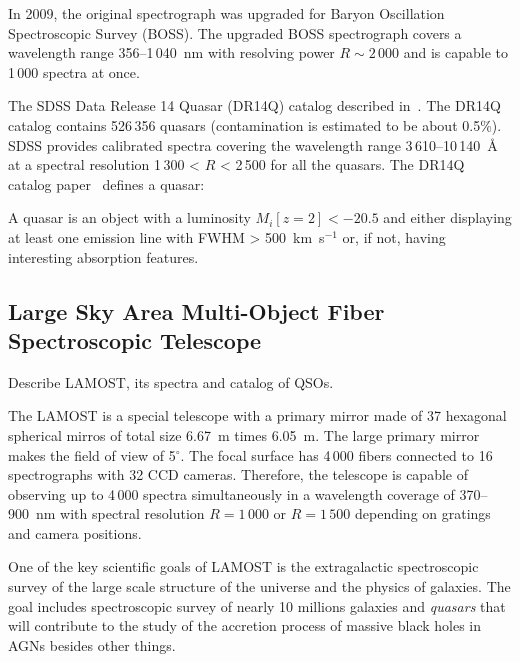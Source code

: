 In 2009, the original spectrograph was upgraded for Baryon Oscillation Spectroscopic Survey (BOSS).
The upgraded BOSS spectrograph covers a wavelength range 356--1\,040~nm
with resolving power \(R \sim 2\,000\)
and is capable to 1\,000 spectra at once.~\cite{smee2013}


The SDSS Data Release 14 Quasar (DR14Q) catalog described in~\cite{paris2018}. %
The DR14Q catalog contains 526\,356 quasars (contamination is estimated to be about 0.5\%).
SDSS provides calibrated spectra covering the wavelength range 3\,610--10\,140~\AA{} at a spectral resolution 1\,300 < \(R\) < 2\,500 for all the quasars.
The DR14Q catalog paper~\cite{paris2018} defines a quasar:

\begin{definition}
	A quasar is an object with a luminosity \(M_i[z = 2] < -20.5\)
	and either displaying at least one emission line with FWHM > 500~km~s\(^{-1}\) or,
	if not, having interesting absorption features.
	\label{qso_definition}
\end{definition}

\subsection{Large Sky Area Multi-Object Fiber Spectroscopic Telescope}

Describe LAMOST, its spectra and catalog of QSOs.

The LAMOST is a special telescope with a primary mirror made of 37 hexagonal spherical mirros of total size 6.67~m times 6.05~m.
The large primary mirror makes the field of view of 5\(^{\circ}\).
The focal surface has 4\,000 fibers connected to 16 spectrographs with 32 CCD cameras.
Therefore, the telescope is capable of observing up to 4\,000 spectra simultaneously
in a wavelength coverage of 370--900~nm with spectral resolution \(R = 1\,000\) or \(R = 1\,500\) depending on gratings and camera positions.~\cite{cui2012}

One of the key scientific goals of LAMOST is the extragalactic spectroscopic survey of the large scale structure of the universe and the physics of galaxies.
The goal includes spectroscopic survey of nearly 10 millions galaxies and \textit{quasars}
that will contribute to the study of the accretion process of massive black holes in AGNs besides other things.~\cite{cui2012}

